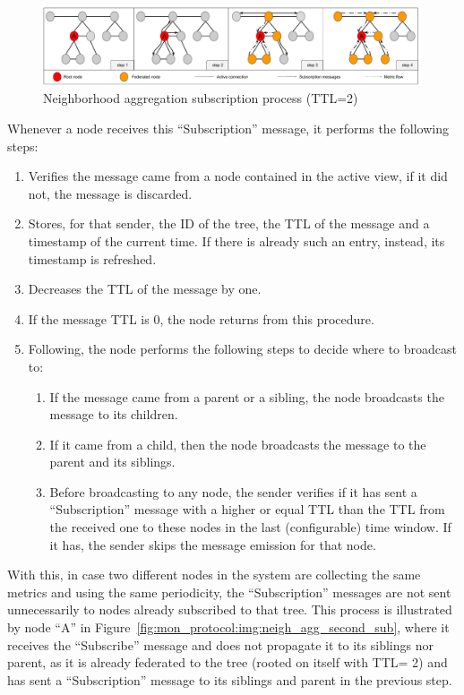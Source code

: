 \begin{figure}[htbp]
    \centering
    \includegraphics[width=\textwidth]{Chapters/aggregation/images/neigh-agg-subscribe.pdf}
    \caption{Neighborhood aggregation subscription process (TTL=2)}
    \label{fig:mon_protocol:img:neigh_agg_sub}
\end{figure}
     
Whenever a node receives this ``Subscription'' message, it performs the following steps:

\begin{enumerate} \label{sec:mon_protocol:enum:neigh_agg_sub_opts}
    \item Verifies the message came from a node contained in the active view, if it did not, the message is discarded.
    \item Stores, for that sender, the ID of the tree, the TTL of the message and a timestamp of the current time. If there is already such an entry, instead, its timestamp is refreshed.
    \item Decreases the TTL of the message by one.
    \item If the message TTL is 0, the node returns from this procedure.
    \item Following, the node performs the following steps to decide where to broadcast to:
            \begin{enumerate}
                \item If the message came from a parent or a sibling, the node broadcasts the message to its children.
                \item If it came from a child, then the node broadcasts the message to the parent and its siblings.
                \item Before broadcasting to any node, the sender verifies if it has sent a ``Subscription'' message with a higher or equal TTL than the TTL from the received one to these nodes in the last (configurable) time window. If it has, the sender skips the message emission for that node.
            \end{enumerate}
\end{enumerate}

With this, in case two different nodes in the system are collecting the same metrics and using the same periodicity, the ``Subscription'' messages are not sent unnecessarily to nodes already subscribed to that tree. This process is illustrated by node ``A'' in Figure~\ref{fig:mon_protocol:img:neigh_agg_second_sub}, where it receives the ``Subscribe'' message and does not propagate it to its siblings nor parent, as it is already federated to the tree (rooted on itself with TTL= 2) and has sent a ``Subscription'' message to its siblings and parent in the previous step.


